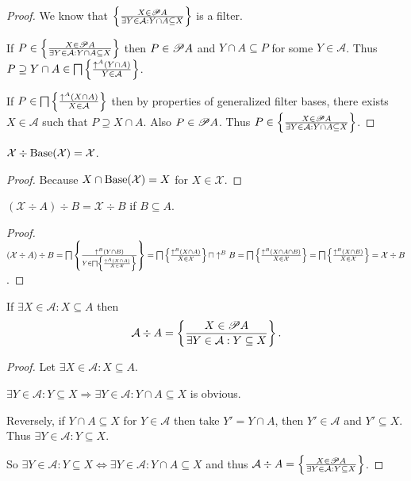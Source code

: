 \begin{proof}
We know that $\left\{ \frac{ X \in \mathscr{P} A }{\exists Y \in \mathcal{A} : Y\cap A \subseteq X }\right\}$ is a filter.

If $P \in \left\{ \frac{ X \in \mathscr{P} A }{ \exists Y
\in \mathcal{A} : Y\cap A \subseteq X }\right\}$ then $P \in \mathscr{P} A$ and $Y\cap A
\subseteq P$ for some $Y \in \mathcal{A}$. Thus $P \supseteq Y \cap A \in
\bigsqcap \left\{ \frac{ \uparrow^A  (Y \cap A) }{ Y \in \mathcal{A} }\right\}$.

If $P \in \bigsqcap \left\{ \frac{ \uparrow^A  (X \cap A) }{
X \in \mathcal{A} }\right\}$ then by properties of generalized filter bases,
there exists $X \in \mathcal{A}$ such that $P \supseteq X \cap A$. Also $P \in
\mathscr{P} A$. Thus $P \in \left\{ \frac{ X \in \mathscr{P} A
}{ \exists Y \in \mathcal{A} : Y\cap A \subseteq X }\right\}$.
\end{proof}

\begin{prop}\label{rebase-itself}
$\mathcal{X}\div\operatorname{Base}(\mathcal{X}) = \mathcal{X}$.
\end{prop}

\begin{proof}
Because $X\cap\operatorname{Base}(\mathcal{X}) = X$ for
$X\in\mathcal{X}$.
\end{proof}

\begin{prop}\label{double-rebase}
  $(\mathcal{X} \div A) \div B = \mathcal{X} \div B$ if $B \subseteq A$.
\end{prop}

\begin{proof}
  $(\mathcal{X} \div A) \div B = \bigsqcap \left\{ \frac{ \uparrow^B  (Y \cap B)
  }{ Y \in \bigsqcap \left\{ \frac{ \uparrow^A  (X \cap A)}{X \in \mathcal{X} }\right\} \mathcal{} }\right\} =
  \bigsqcap \left\{ \frac{ \uparrow^B  (X \cap A) }{ X \in
  \mathcal{X} }\right\} \sqcap \uparrow^B B =
  \bigsqcap \left\{ \frac{ \uparrow^B  (X
  \cap A \cap B) }{ X \in \mathcal{X} }\right\} =
  \bigsqcap \left\{ \frac{ \uparrow^B  (X
  \cap B) }{ X \in \mathcal{X} }\right\} =
  \mathcal{X} \div B$.
\end{proof}

\begin{prop}
If $\exists X\in\mathcal{A}:X\subseteq A$ then
\[
\mathcal{A}\div A=\left\{ \frac{X\in\mathscr{P} A}{\exists Y\in\mathcal{A}:Y\subseteq X}\right\}.
\]
\end{prop}

\begin{proof}
Let $\exists X\in\mathcal{A}:X\subseteq A$.

$\exists Y\in\mathcal{A}:Y\subseteq X \Rightarrow \exists Y\in\mathcal{A}:Y\cap A\subseteq X$ is obvious.

Reversely, if $Y\cap A\subseteq X$ for $Y\in\mathcal{A}$ then take $Y'=Y\cap A$, then $Y'\in\mathcal{A} $ and $Y'\subseteq X$.
Thus $\exists Y\in\mathcal{A}:Y\subseteq X$.

So $\exists Y\in\mathcal{A}:Y\subseteq X \Leftrightarrow \exists Y\in\mathcal{A}:Y\cap A\subseteq X$ and thus
$\mathcal{A}\div A=\left\{ \frac{X\in\mathscr{P} A}{\exists Y\in\mathcal{A}:Y\subseteq X}\right\}$.
\end{proof}

